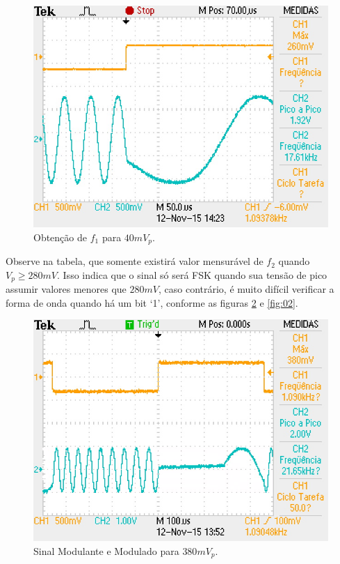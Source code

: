 \documentclass[12pt,a4paper]{article}%
\begin{document}
\begin{figure}[H]
\centering
\includegraphics[scale=0.5]{imagem/TEK0008}
\caption{Obtenção de $f_1$ para $40 mV_p$.}
\label{fig:08}
\end{figure}


Observe na tabela, que somente existirá valor mensurável de $f_2$ quando $V_p \geq 280 mV$. Isso indica que o sinal só será FSK quando sua tensão de pico assumir valores menores que $280 mV$, caso contrário, é muito difícil verificar a forma de onda quando há um bit ‘1’, conforme as figuras \ref{fig:01} e \ref{fig:02}.

\begin{figure}[H]
\centering
\includegraphics[scale=0.5]{imagem/TEK0001}
\caption{Sinal Modulante e Modulado para $380 mV_p$.}
\label{fig:01}
\end{figure}
\end{document}
